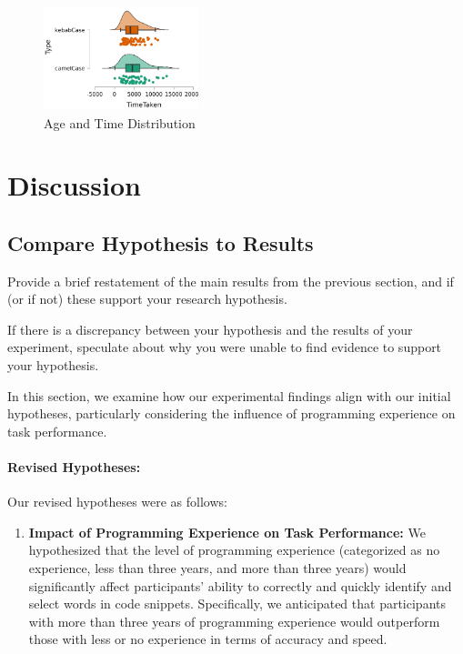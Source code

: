 \documentclass{article}
\begin{document}
\begin{figure}[H]
    \centering
    \includegraphics[width=0.4\textwidth]{difference_type_statistics.png}
    \caption{Age and Time Distribution}
\end{figure}

\section{Discussion}
\subsection{Compare Hypothesis to Results}
Provide a brief restatement of the main results from the previous section, and if (or if not) these support your research hypothesis.

If there is a discrepancy between your hypothesis and the results of your experiment, speculate about why you were unable to find evidence to support your hypothesis.


\label{subsec:compare_hypothesis_results}

In this section, we examine how our experimental findings align with our initial hypotheses, particularly considering the influence of programming experience on task performance.

\paragraph{Revised Hypotheses:}
Our revised hypotheses were as follows:
\begin{enumerate}
    \item \textbf{Impact of Programming Experience on Task Performance:} We hypothesized that the level of programming experience (categorized as no experience, less than three years, and more than three years) would significantly affect participants' ability to correctly and quickly identify and select words in code snippets. Specifically, we anticipated that participants with more than three years of programming experience would outperform those with less or no experience in terms of accuracy and speed.
\end{enumerate}
\end{document}
